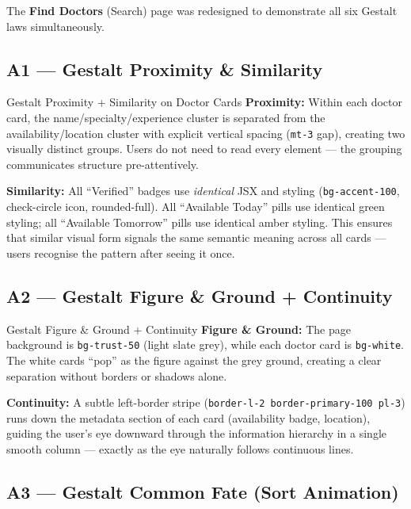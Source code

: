 \documentclass[12pt, a4paper]{article}
\begin{document}
\vspace{0.4cm}

The \textbf{Find Doctors} (Search) page was redesigned to demonstrate all six Gestalt laws simultaneously.

\subsection{A1 --- Gestalt Proximity \& Similarity}

\begin{featurebox}{Gestalt Proximity + Similarity on Doctor Cards}
\textbf{Proximity:} Within each doctor card, the name/specialty/experience cluster is separated from the availability/location cluster with explicit vertical spacing (\texttt{mt-3} gap), creating two visually distinct groups. Users do not need to read every element --- the grouping communicates structure pre-attentively.

\textbf{Similarity:} All ``Verified'' badges use \emph{identical} JSX and styling (\texttt{bg-accent-100}, check-circle icon, rounded-full). All ``Available Today'' pills use identical green styling; all ``Available Tomorrow'' pills use identical amber styling. This ensures that similar visual form signals the same semantic meaning across all cards --- users recognise the pattern after seeing it once.
\end{featurebox}

\subsection{A2 --- Gestalt Figure \& Ground + Continuity}

\begin{featurebox}{Gestalt Figure \& Ground + Continuity}
\textbf{Figure \& Ground:} The page background is \texttt{bg-trust-50} (light slate grey), while each doctor card is \texttt{bg-white}. The white cards ``pop'' as the figure against the grey ground, creating a clear separation without borders or shadows alone.

\textbf{Continuity:} A subtle left-border stripe (\texttt{border-l-2 border-primary-100 pl-3}) runs down the metadata section of each card (availability badge, location), guiding the user's eye downward through the information hierarchy in a single smooth column --- exactly as the eye naturally follows continuous lines.
\end{featurebox}

\subsection{A3 --- Gestalt Common Fate (Sort Animation)}
\end{document}
